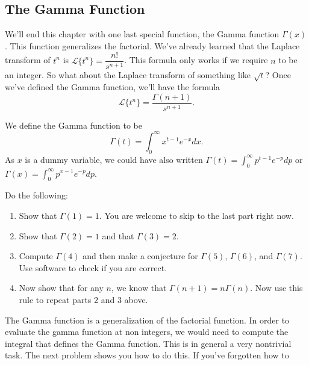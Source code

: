 \subsection{The Gamma Function}
%
We'll end this chapter with one last special function, the Gamma function $\Gamma(x)$. This function generalizes the factorial.  We've already learned that the Laplace transform of $t^n$ is $\mathscr{L}\{t^n\} = \dfrac{n!}{s^{n+1}}$.  This formula only works if we require $n$ to be an integer.  So what about the Laplace transform of something like $\sqrt{t}$? Once we've defined the Gamma function, we'll have the formula $$\mathscr{L}\{t^n\} = \dfrac{\Gamma(n+1)}{s^{n+1}}.$$

\begin{definition}
 We define the Gamma function to be 
$$\Gamma(t) = \int_0^\infty x^{t-1}e^{-x} dx.$$ 
As $x$ is a dummy variable, we could have also written
$\Gamma(t) = \int_0^\infty p^{t-1}e^{-p} dp$ or
$\Gamma(x) = \int_0^\infty p^{x-1}e^{-p} dp$.
\end{definition}

\begin{problem}
 Do the following:
\begin{enumerate}
 \item Show that $\Gamma(1)=1$. You are welcome to skip to the last part right now.   
 \item Show that $\Gamma(2)=1$ and that $\Gamma(3)=2$. 
 \item Compute $\Gamma(4)$ and then make a conjecture for $\Gamma(5)$, $\Gamma(6)$, and $\Gamma(7)$. Use software to check if you are correct.
 \item Now show that for any $n$, we know that $\Gamma(n+1)=n\Gamma(n)$. Now use this rule to repeat parts 2 and 3 above. 
\end{enumerate}

\end{problem}

The Gamma function is a generalization of the factorial function. In order to evaluate the gamma function at non integers, we would need to compute the integral that defines the Gamma function.  This is in general a very nontrivial task.  The next problem shows you how to do this. If you've forgotten how to 

